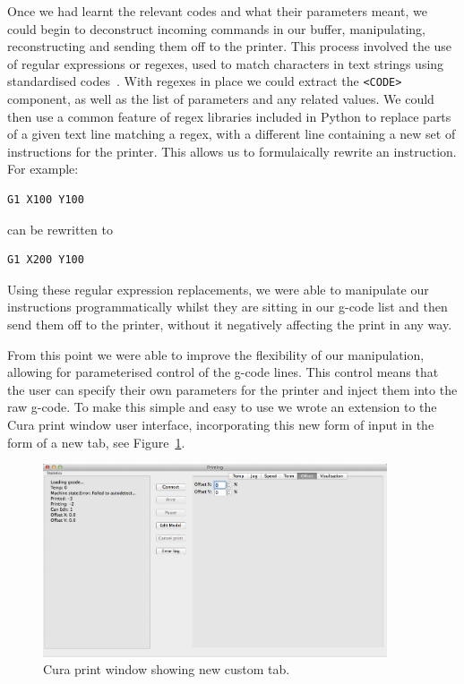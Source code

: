 \documentclass[pdftex, 11pt]{report} %
\begin{document}
Once we had learnt the relevant codes and what their parameters meant, we could begin to deconstruct incoming commands in our buffer, manipulating, reconstructing and sending them off to the printer. This process involved the use of regular expressions or regexes, used to match characters in text strings using standardised codes~\cite{Aho1992}. With regexes in place we could extract the \verb|<CODE>| component, as well as the list of parameters and any related values. We could then use a common feature of regex libraries included in Python to replace parts of a given text line matching a regex, with a different line containing a new set of instructions for the printer. This allows us to formulaically rewrite an instruction. For example:
\begin{verbatim}
G1 X100 Y100
\end{verbatim}
can be rewritten to
\begin{verbatim}
G1 X200 Y100
\end{verbatim}

Using these regular expression replacements, we were able to manipulate our instructions programmatically whilst they are sitting in our g-code list and then send them off to the printer, without it negatively affecting the print in any way.

	From this point we were able to improve the flexibility of our manipulation, allowing for parameterised control of the g-code lines. This control means that the user can specify their own parameters for the printer and inject them into the raw g-code. 
To make this simple and easy to use we wrote an extension to the Cura print window user interface, incorporating this new form of input in the form of a new tab, see Figure~\ref{figure:CuraCustomTab}.

\begin{figure}[H]
  \centering
  \includegraphics[width=4in]{CuraCustomTab.png}
  \caption{Cura print window showing new custom tab.}
  \label{figure:CuraCustomTab}
\end{figure}
\end{document}
